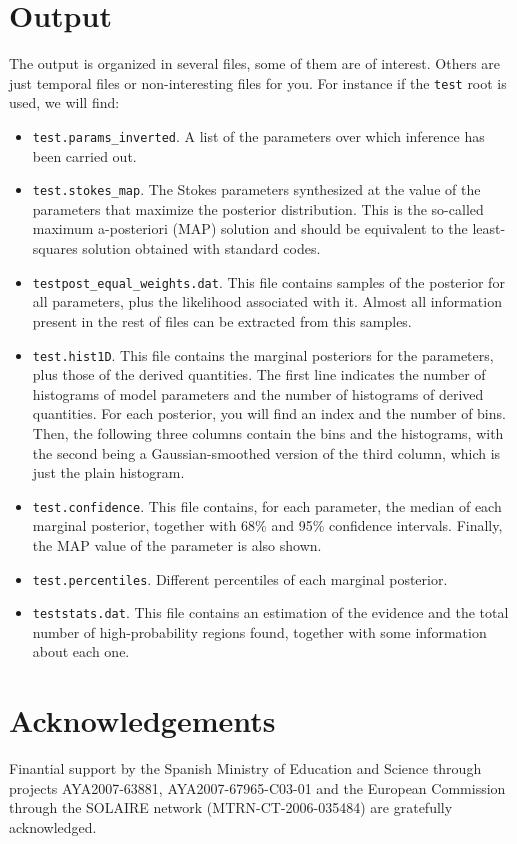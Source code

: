 \documentclass[12pt]{article}
\begin{document}
\section{Output}
The output is organized in several files, some of them are of
interest. Others are just temporal files or non-interesting files
for you. For instance if the \texttt{test} root is used,
we will find:
\begin{itemize}
\item \texttt{test.params\_inverted}. A list of the parameters over which inference has been carried out.
\item \texttt{test.stokes\_map}. The Stokes parameters synthesized at the value of the parameters that
maximize the posterior distribution. This is the so-called maximum a-posteriori (MAP) solution and
should be equivalent to the least-squares solution obtained with standard codes.
\item \texttt{testpost\_equal\_weights.dat}. This file contains samples of the posterior for all
parameters, plus the likelihood associated with it. Almost all information present in the
rest of files can be extracted from this samples.
\item \texttt{test.hist1D}. This file contains the marginal posteriors for the parameters, plus
those of the derived quantities. The first line indicates the number of histograms of
model parameters and the number of histograms of derived quantities. For each posterior,
you will find an index and the number of bins. Then, the following three columns contain
the bins and the histograms, with the second being a Gaussian-smoothed version of the 
third column, which is just the plain histogram.
\item \texttt{test.confidence}. This file contains, for each parameter, the median of each marginal 
posterior, together with 68\% and 95\% confidence intervals. Finally, the MAP value of
the parameter is also shown.
\item \texttt{test.percentiles}. Different percentiles of each marginal posterior.
\item \texttt{teststats.dat}. This file contains an estimation of the evidence and the
total number of high-probability regions found, together with some information
about each one.
\end{itemize}

\section*{Acknowledgements}
Finantial support by
the Spanish Ministry of Education and Science through projects AYA2007-63881, AYA2007-67965-C03-01 and
the European Commission through the SOLAIRE network (MTRN-CT-2006-035484) are gratefully acknowledged. 

% 
% 
\end{document}
